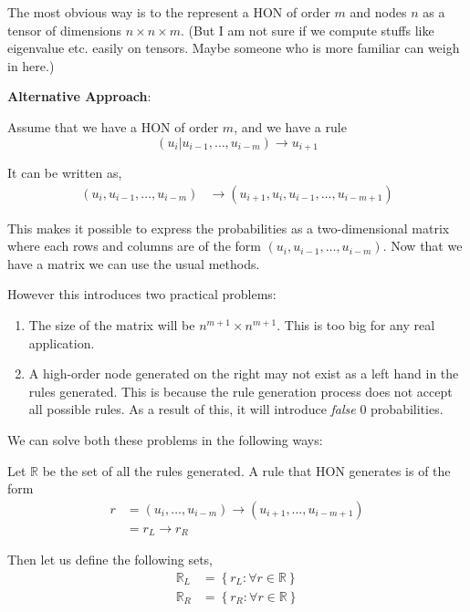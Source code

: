 \documentclass[]{article}
\begin{document}
The most obvious way is to the represent a HON of order $m$ and nodes $n$ as a tensor of dimensions $n\times n \times m$. (But I am not sure if we compute stuffs like eigenvalue etc. easily on tensors. Maybe someone who is more familiar can weigh in here.)

\textbf{Alternative Approach}:

Assume that we have a HON of order $m$, and we have a rule
\[
\left(u_i \vert u_{i-1}, \ldots, u_{i-m}\right) \rightarrow u_{i+1}
\]

It can be written as,
\begin{align*}
	\left(u_i, u_{i-1}, \ldots, u_{i-m}\right) &\rightarrow \left(u_{i+1}, u_i, u_{i-1}, \ldots, u_{i-m+1}\right)
\end{align*}

This makes it possible to express the probabilities as a two-dimensional matrix where each rows and columns are of the form $(u_i, u_{i-1}, \ldots, u_{i-m})$. Now that we have a matrix we can use the usual methods.

However this introduces two practical problems:
\begin{enumerate}
	\item The size of the matrix will be $n^{m+1} \times n^{m+1}$. This is too big for any real application.
	\item A high-order node generated on the right may not exist as a left hand in the rules generated. This is because the rule generation process does not accept all possible rules. As a result of this, it will introduce \textit{false} $0$ probabilities.
\end{enumerate}

We can solve both these problems in the following ways:

Let $\mathbb{R}$ be the set of all the rules generated. A rule that HON generates is of the form 
\begin{align*}
	r &= \left(u_i, \ldots, u_{i-m}\right) \rightarrow \left(u_{i+1}, \ldots, u_{i-m+1}\right) \\
	& = r_L \rightarrow r_R	
\end{align*}

Then let us define the following sets,
\begin{align*}
	\mathbb{R}_L & = \left\{ r_L : \forall r \in \mathbb{R} \right\}\\
	\mathbb{R}_R & = \left\{ r_R : \forall r \in \mathbb{R} \right\}
\end{align*}
\end{document}
